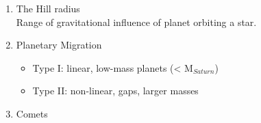 \documentclass[12pt]{article}
\begin{document}
\begin{enumerate}
    \item{The Hill radius} \\
    Range of gravitational influence of planet orbiting a star. 
    \item{Planetary Migration} \\
    \begin{itemize}
      \item Type I: linear, low-mass planets (< M$_{Saturn}$)
      \item Type II: non-linear, gaps, larger masses
    \end{itemize}

    \item{Comets}


\end{enumerate}
\end{document}
